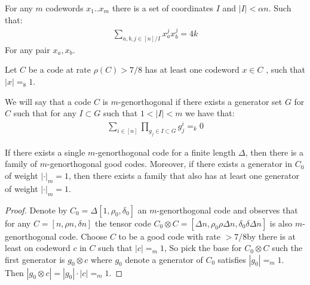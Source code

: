 \documentclass[manuscript,screen,review]{acmart}
\begin{document}
\begin{claim}
  For any $m$ codewords $x_{1}..x_{m}$ there is a set of coordinates $I$ and $|I| < \alpha n$. Such that:  
  \begin{equation*}
    \begin{split}
      \sum_{a,b,j \in [n]/I }x_{a}^{j}x_{b}^{j} = 4k
    \end{split}
  \end{equation*}
  For any pair $x_{a},x_{b}$. 
\end{claim}

\begin{claim}
  \label{claim:oneg}
  Let $C$ be a code at rate $\rho(C) > 7/8 $ has at least one codeword $x \in C$ , such that $|x| =_{8} 1 $.
\end{claim}

\begin{definition}
  We will say that a code $C$ is $m$-genorthogonal if there exists a generator set $G$ for $C$ such that for any $I \subset G$ such that $1 < |I| < m$ we have that:
  \begin{equation*}
    \begin{split}
      \sum_{i \in [n]}\prod_{g_{j}\in I \subset G}g_{j}^{i} =_{k} 0 
    \end{split}
  \end{equation*}
\end{definition}

\begin{claim}  
If there exists a single $m$-genorthogonal code for a finite length $\Delta$, then there is a family of $m$-genorthogonal good codes. Moreover, if there exists a generator in $C_0$ of weight $|\cdot|_m = 1$, then there exists a family that also has at least one generator of weight $|\cdot|_m = 1$.
\end{claim}
\begin{proof}
  Denote by $C_{0} = \Delta[1,\rho_{0}, \delta_{0}]$ an $m$-genorthogonal code and observes that for any $C = [n,\rho n, \delta n]$ the tensor code $C_{0}\otimes C = [\Delta n, \rho_{0} \rho \Delta n, \delta_{0} \delta \Delta n]$ is also $m$-genorthogonal code. Choose $C$ to be a good code with rate $> 7/8$by  there is at least on codeword $c$ in $C$ such that $|c| =_{m} 1$, So pick the base for $C_{0}\otimes C$ such the first generator is $g_{0} \otimes c$ where $g_{0}$ denote a generator of $C_{0}$ satisfies $|g_{0}| =_{m} 1$. 
  Then $|g_{0} \otimes c | = |g_{0}| \cdot |c| =_{m} 1$.  
\end{proof}
\end{document}
